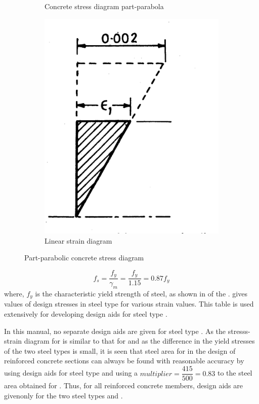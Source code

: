 \begin{figure}
\begin{subfigure}{0.3\textwidth}
\caption{Concrete stress diagram part-parabola}
\label{fig:stress}
\end{subfigure}
%
\begin{subfigure}{0.3\textwidth}
\centering
\includegraphics[width=\textwidth]{images/linearstrainc.png}
\caption{Linear strain diagram}
\label{fig:strain}
\end{subfigure}
\caption{Part-parabolic concrete stress diagram}
\label{fig:part}
\end{figure}

\begin{equation}
f_s=\frac{f_y}{\gamma_m}=\frac{f_y}{1.15}=0.87f_y
\end{equation}
where, $f_y$ is the characteristic yield strength of steel, as shown in
 of the .  gives values of design
stresses in steel type {\fefouronefive} for various strain values.
This table is used extensively for developing design aids for steel
type {\fefouronefive}. 

In this manual, no separate design aids are given
for steel type {\fefivezerozero}. As the stresss-strain diagram for
{\fefivezerozero} is similar to that for {\fefouronefive} and as the
difference in the yield stresses of the two steel types is small, it
is seen that steel area for {\fefivezerozero}  in the design of
reinforced concrete sections can always be found with reasonable
accuracy by using design aids for steel type {\fefouronefive} and using
a $multiplier=\dfrac{415}{500} = 0.83$ to the steel area obtained for
{\fefouronefive}. Thus, for all reinforced concrete members, design aids
are givenonly for the two steel types {\fetwofivezero} and {\fefouronefive}.



